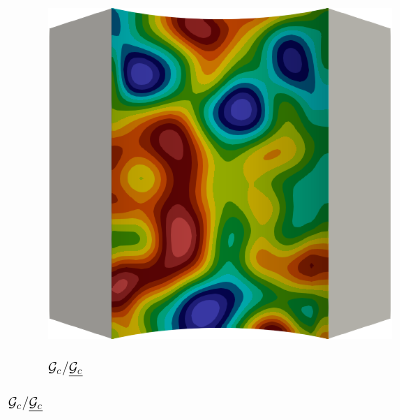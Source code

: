 \begin{figure}[!htbp]
\begin{subfigure}{0.25\textwidth}
    \includegraphics[width=\textwidth]{Chapter5/figures/spallation/Gc.0000}
  \end{subfigure}
  \begin{subfigure}{0.1\textwidth}
    \centering
    \caption*{${\mathcal{G}_c}/\underline{{\mathcal{G}_c}}$}

\end{subfigure}
\end{figure}

